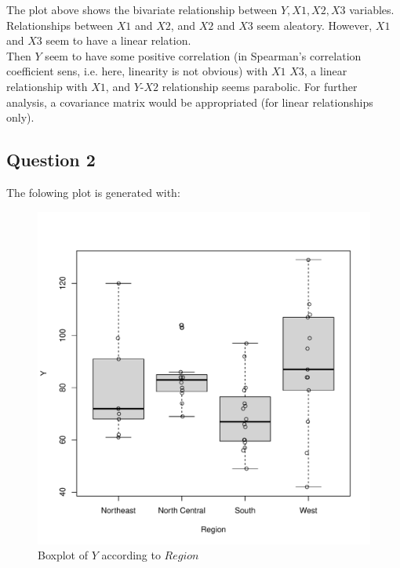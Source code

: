 \documentclass[12pt,letterpaper]{article}
\begin{document}
The plot above shows the bivariate relationship between $Y,X1,X2,X3$ variables.  Relationships between $X1$ and $X2$, and $X2$ and $X3$ seem aleatory. However, $X1$ and $X3$ seem to have a linear relation. \\
Then $Y$ seem to have some positive correlation (in  	Spearman's correlation coefficient sens, i.e. here, linearity is not obvious)  with $X1$  $X3$, a linear relationship with $X1$, and $Y$-$X2$ relationship seems parabolic. For further analysis, a covariance matrix would be appropriated (for linear relationships only).

\subsection*{Question 2}

The folowing plot is generated with:
  
\begin{figure}[h!]\centering
	\caption{\footnotesize Boxplot of $Y$ according to $Region$ }
	\label{fig:plot_2}
	\includegraphics[width=.85\textwidth]{regions_boxplot.pdf}
\end{figure}
\end{document}
